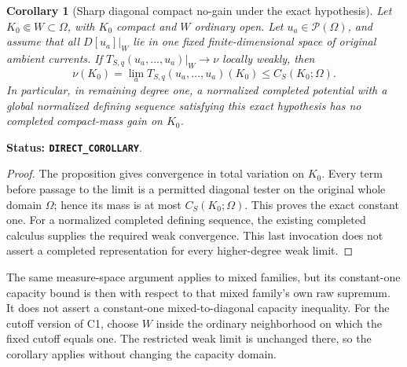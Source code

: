 \documentclass[11pt,a4paper]{article}
\numberwithin{equation}{section}
\newtheorem{corollary}[theorem]{Corollary}
\theoremstyle{definition}
\theoremstyle{remark}
\begin{document}
\begin{corollary}[Sharp diagonal compact no-gain under the exact hypothesis]
\label{cor:r5-finite-curvature-compact-no-gain}
Let $K_0\Subset W\subset\Omega$, with $K_0$ compact and $W$
ordinary open.  Let $u_a\in\mathcal P(\Omega)$, and assume
that all $D[u_a]|_W$ lie in one fixed finite-dimensional space
of original ambient currents.  If
$T_{S,q}(u_a,\ldots,u_a)|_W\to\nu$ locally weakly, then
\[
 \nu(K_0)=\lim_aT_{S,q}(u_a,\ldots,u_a)(K_0)
                               \le C_S(K_0;\Omega).
\]
In particular, in remaining degree one, a normalized completed
potential with a global normalized defining sequence satisfying
this exact hypothesis has no completed compact-mass gain on
$K_0$.
\end{corollary}

\noindent\textbf{Status: \texttt{DIRECT\_COROLLARY}}.

\begin{proof}
The proposition gives convergence in total variation on $K_0$.
Every term before passage to the limit is a permitted diagonal
tester on the original whole domain $\Omega$; hence its mass
is at most $C_S(K_0;\Omega)$.  This proves the exact constant
one.  For a normalized completed defining sequence, the
existing completed calculus supplies the required weak
convergence.  This last invocation does not assert a
completed representation for every higher-degree weak limit.
\end{proof}

The same measure-space argument applies to mixed families,
but its constant-one capacity bound is then with respect to
that mixed family's own raw supremum.  It does not assert a
constant-one mixed-to-diagonal capacity inequality.
For the cutoff version of C1, choose $W$ inside the ordinary
neighborhood on which the fixed cutoff equals one.  The
restricted weak limit is unchanged there, so the corollary
applies without changing the capacity domain.
\end{document}
